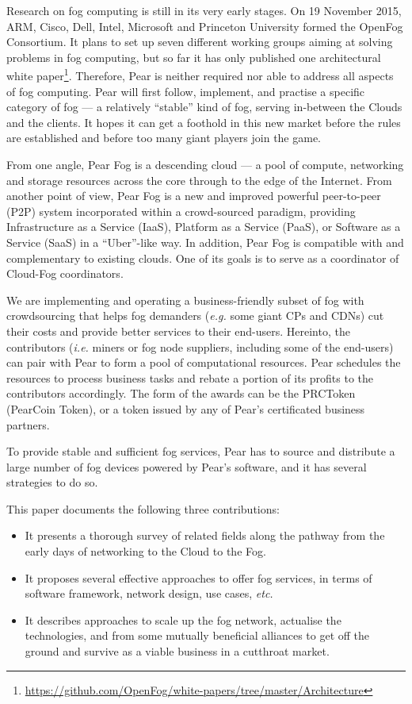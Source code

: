 Research on fog computing is still in its very early stages. On 19 November 2015, ARM, Cisco, Dell, Intel, Microsoft and Princeton University formed the OpenFog Consortium. It plans to set up seven different working groups aiming at solving problems in fog computing, but so far it has only published one architectural white paper\footnote{\url{https://github.com/OpenFog/white-papers/tree/master/Architecture}}. Therefore, Pear is neither required nor able to address all aspects of fog computing. Pear will first follow, implement, and practise a specific category of fog --- a relatively ``stable'' kind of fog, serving in-between the Clouds and the clients. It hopes it can get a foothold in this new market before the rules are established and before too many giant players join the game.

From one angle, Pear Fog is a descending cloud --- a pool of compute, networking and storage resources across the core through to the edge of the Internet. From another point of view, Pear Fog is a new and improved powerful peer-to-peer (P2P) system incorporated within a crowd-sourced paradigm, providing Infrastructure as a Service (IaaS), Platform as a Service (PaaS), or Software as a Service (SaaS) in a ``Uber''-like way. 
In addition, Pear Fog is compatible with and complementary to existing clouds. One of its goals is to serve as a coordinator of Cloud-Fog coordinators. 

We are implementing and operating a business-friendly subset of fog with crowdsourcing that helps fog demanders ({\em e.g.} some giant CPs and CDNs) cut their costs and provide better services to their end-users. Hereinto, the contributors ({\em i.e.} miners or fog node suppliers, including some of the end-users) can pair with Pear to form a pool of computational resources. 
Pear schedules the resources to process business tasks and rebate a portion of its profits to the contributors accordingly. The form of the awards can be the PRCToken (PearCoin Token), or a token issued by any of Pear's certificated business partners. 

To provide stable and sufficient fog services, Pear has to source and distribute a large number of fog devices powered by Pear's software, and it has several strategies to do so. %

This paper documents the following three contributions:
\begin{itemize}
	\item It presents a thorough survey of related fields along the pathway from the early days of networking to the Cloud to the Fog. 
	\item It proposes several effective approaches to offer fog services, in terms of software framework, network design, use cases, {\em etc.}
	\item It describes approaches to scale up the fog network, actualise the technologies, and from some mutually beneficial alliances to get off the ground and survive as a viable business in a cutthroat market. 
\end{itemize} 

